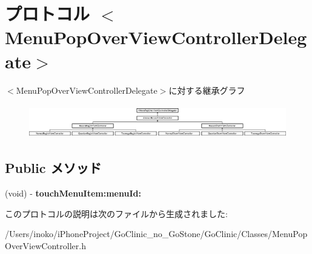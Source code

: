 \hypertarget{protocol_menu_pop_over_view_controller_delegate-p}{
\section{プロトコル $<$MenuPopOverViewControllerDelegate$>$}
\label{protocol_menu_pop_over_view_controller_delegate-p}
}
$<$MenuPopOverViewControllerDelegate$>$に対する継承グラフ\begin{figure}[H]
\begin{center}
\leavevmode
\includegraphics[height=1.487384cm]{protocol_menu_pop_over_view_controller_delegate-p}
\end{center}
\end{figure}
\subsection*{Public メソッド}
\begin{DoxyCompactItemize}
\item 
\hypertarget{protocol_menu_pop_over_view_controller_delegate-p_adce474b1b331fae72e4d11d5c1f324d5}{
(void) -\/ {\bfseries touchMenuItem:menuId:}}
\label{protocol_menu_pop_over_view_controller_delegate-p_adce474b1b331fae72e4d11d5c1f324d5}

\end{DoxyCompactItemize}


このプロトコルの説明は次のファイルから生成されました:\begin{DoxyCompactItemize}
\item 
/Users/inoko/iPhoneProject/GoClinic\_\-no\_\-GoStone/GoClinic/Classes/MenuPopOverViewController.h\end{DoxyCompactItemize}
